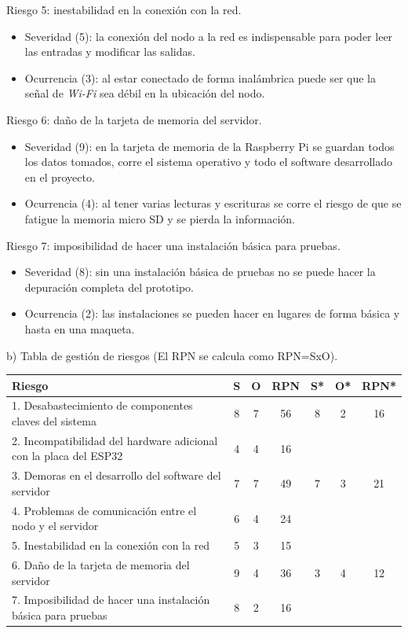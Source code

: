 \documentclass[
11pt, %
]{charter}
\begin{document}
Riesgo 5: inestabilidad en la conexión con la red.
\begin{itemize}
	\item Severidad (5): la conexión del nodo a la red es indispensable para poder leer las entradas y modificar las salidas.
	\item Ocurrencia (3): al estar conectado de forma inalámbrica puede ser que la señal de \textit{Wi-Fi} sea débil en la ubicación del nodo.
\end{itemize}

Riesgo 6: daño de la tarjeta de memoria del servidor.
\begin{itemize}
	\item Severidad (9): en la tarjeta de memoria de la Raspberry Pi se guardan todos los datos tomados, corre el sistema operativo y todo el software desarrollado en el proyecto.
	\item Ocurrencia (4): al tener varias lecturas y escrituras se corre el riesgo de que se fatigue la memoria micro SD y se pierda la información.
\end{itemize}

Riesgo 7: imposibilidad de hacer una instalación básica para pruebas.
\begin{itemize}
	\item Severidad (8): sin una instalación básica de pruebas no se puede hacer la depuración completa del prototipo.
	\item Ocurrencia (2): las instalaciones se pueden hacer en lugares de forma básica y hasta en una maqueta.
\end{itemize}

b) Tabla de gestión de riesgos (El RPN se calcula como RPN=SxO).

\begin{table}[htpb]
\centering
\begin{tabularx}{\linewidth}{@{}|X|c|c|c|c|c|c|@{}}
\hline
\rowcolor[HTML]{C0C0C0} 
Riesgo & S & O & RPN & S* & O* & RPN* \\ \hline
1. Desabastecimiento de componentes claves del sistema				&8	&7	&56\cellcolor{red}	&8	&2	&16\cellcolor{green}	\\ \hline
2. Incompatibilidad del hardware adicional con la placa del ESP32	&4	&4	&16\cellcolor{green}	&	&	&	\\ \hline
3. Demoras en el desarrollo del software del servidor				&7	&7	&49\cellcolor{red}	&7	&3	&21\cellcolor{green} 	\\ \hline
4. Problemas de comunicación entre el nodo y el servidor				&6	&4	&24\cellcolor{green}	&	&	& 	\\ \hline
5. Inestabilidad en la conexión con la red							&5	&3	&15\cellcolor{green}	&	&	&	\\ \hline
6. Daño de la tarjeta de memoria del servidor						&9	&4	&36\cellcolor{red}	&3	&4	&12\cellcolor{green}	\\ \hline
7. Imposibilidad de hacer una instalación básica para pruebas		&8	&2	&16\cellcolor{green}	&	&	&	\\ \hline
\end{tabularx}%
\end{table}
\end{document}

